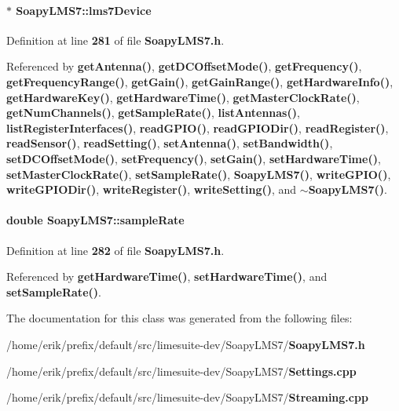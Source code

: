 \paragraph[{lms7\+Device}]{$\ast$ Soapy\+L\+M\+S7\+::lms7\+Device\hspace{0.3cm}{\ttfamily [private]}}\label{classSoapyLMS7_a81a874708275b358783638ecadc2137a}


Definition at line {\bf 281} of file {\bf Soapy\+L\+M\+S7.\+h}.



Referenced by {\bf get\+Antenna()}, {\bf get\+D\+C\+Offset\+Mode()}, {\bf get\+Frequency()}, {\bf get\+Frequency\+Range()}, {\bf get\+Gain()}, {\bf get\+Gain\+Range()}, {\bf get\+Hardware\+Info()}, {\bf get\+Hardware\+Key()}, {\bf get\+Hardware\+Time()}, {\bf get\+Master\+Clock\+Rate()}, {\bf get\+Num\+Channels()}, {\bf get\+Sample\+Rate()}, {\bf list\+Antennas()}, {\bf list\+Register\+Interfaces()}, {\bf read\+G\+P\+I\+O()}, {\bf read\+G\+P\+I\+O\+Dir()}, {\bf read\+Register()}, {\bf read\+Sensor()}, {\bf read\+Setting()}, {\bf set\+Antenna()}, {\bf set\+Bandwidth()}, {\bf set\+D\+C\+Offset\+Mode()}, {\bf set\+Frequency()}, {\bf set\+Gain()}, {\bf set\+Hardware\+Time()}, {\bf set\+Master\+Clock\+Rate()}, {\bf set\+Sample\+Rate()}, {\bf Soapy\+L\+M\+S7()}, {\bf write\+G\+P\+I\+O()}, {\bf write\+G\+P\+I\+O\+Dir()}, {\bf write\+Register()}, {\bf write\+Setting()}, and {\bf $\sim$\+Soapy\+L\+M\+S7()}.

\paragraph[{sample\+Rate}]{\setlength{\rightskip}{0pt plus 5cm}double Soapy\+L\+M\+S7\+::sample\+Rate\hspace{0.3cm}{\ttfamily [private]}}\label{classSoapyLMS7_af7d8f7c9dfdfea047e6774bd325e6c74}


Definition at line {\bf 282} of file {\bf Soapy\+L\+M\+S7.\+h}.



Referenced by {\bf get\+Hardware\+Time()}, {\bf set\+Hardware\+Time()}, and {\bf set\+Sample\+Rate()}.



The documentation for this class was generated from the following files\+:\begin{DoxyCompactItemize}
\item 
/home/erik/prefix/default/src/limesuite-\/dev/\+Soapy\+L\+M\+S7/{\bf Soapy\+L\+M\+S7.\+h}\item 
/home/erik/prefix/default/src/limesuite-\/dev/\+Soapy\+L\+M\+S7/{\bf Settings.\+cpp}\item 
/home/erik/prefix/default/src/limesuite-\/dev/\+Soapy\+L\+M\+S7/{\bf Streaming.\+cpp}\end{DoxyCompactItemize}
